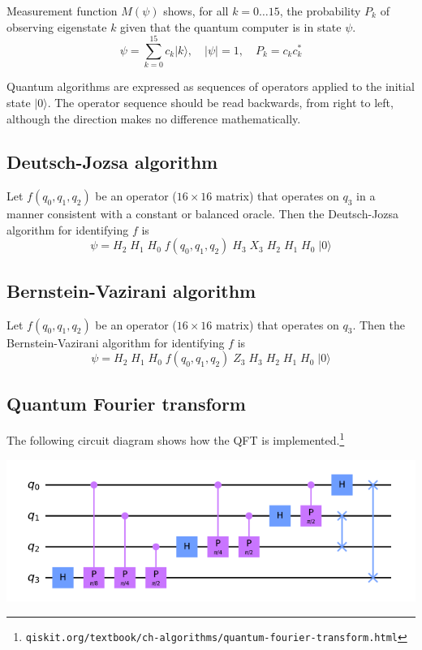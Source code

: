 \documentclass[12pt]{article}
\begin{document}
\bigskip
\noindent
Measurement function $M(\psi)$ shows, for all $k=0\ldots15$, the probability $P_k$ of observing eigenstate $k$
given that the quantum computer is in state $\psi$.
\begin{equation*}
\psi=\sum_{k=0}^{15}c_k|k\rangle,\quad|\psi|=1,\quad P_k=c_kc_k^*
\end{equation*}

\noindent
Quantum algorithms are expressed as sequences of operators applied
to the initial state $|0\rangle$.
The operator sequence should be read backwards, from right to left,
although the direction makes no difference mathematically.

\subsection*{Deutsch-Jozsa algorithm}
Let $f(q_0,q_1,q_2)$ be an operator ($16\times16$ matrix) that operates on $q_3$
in a manner consistent with a constant or balanced oracle.
Then the Deutsch-Jozsa algorithm for identifying $f$ is
\begin{equation*}
\psi = H_2 \; H_1 \; H_0 \; f(q_0,q_1,q_2) \; H_3 \; X_3 \; H_2 \; H_1 \; H_0 \; |0\rangle
\end{equation*}

\subsection*{Bernstein-Vazirani algorithm}
Let $f(q_0,q_1,q_2)$ be an operator ($16\times16$ matrix) that operates on $q_3$.
Then the Bernstein-Vazirani algorithm for identifying $f$ is
\begin{equation*}
\psi = H_2 \; H_1 \; H_0 \; f(q_0,q_1,q_2) \; Z_3 \; H_3 \; H_2 \; H_1 \; H_0 \; |0\rangle
\end{equation*}

\subsection*{Quantum Fourier transform}
The following circuit diagram shows how the QFT is implemented.\footnote
{\tt qiskit.org/textbook/ch-algorithms/quantum-fourier-transform.html}

\begin{center}
\includegraphics[scale=0.5]{qft.png}
\end{center}
\end{document}
